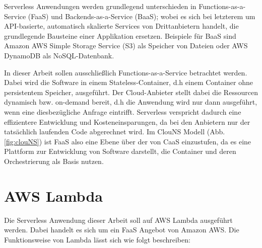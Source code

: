 Serverless Anwendungen werden grundlegend unterschieden in Functions-as-a-Service (FaaS) und Backends-as-a-Service (BaaS); wobei es sich bei letzterem um API-basierte, automatisch skalierte Services von Drittanbietern handelt, die grundlegende Bausteine einer Applikation ersetzen\cite{ken_owens_cncf_2018}. Beispiele für BaaS sind Amazon AWS Simple Storage Service (S3) als Speicher von Dateien oder AWS DynamoDB als NoSQL-Datenbank.

In dieser Arbeit sollen ausschließlich Functions-as-a-Service betrachtet werden. Dabei wird die Software in einem Stateless-Container, d.h einem Container ohne persistentem Speicher, ausgeführt. Der Cloud-Anbieter stellt dabei die Ressourcen dynamisch bzw. on-demand bereit, d.h die Anwendung wird nur dann ausgeführt, wenn eine diesbezügliche Anfrage eintrifft. Serverless verspricht dadurch eine effizientere Entwicklung und Kosteneinsparungen, da bei den Anbietern nur der tatsächlich laufenden Code abgerechnet wird\cite{noauthor_was_2016}. Im ClouNS Modell (Abb. \ref{fig:clouNS}) ist FaaS also eine Ebene über der von CaaS einzustufen, da es eine Plattform zur Entwicklung von Software darstellt, die Container und deren Orchestrierung als Basis nutzen.

\section{AWS Lambda}
Die Serverless Anwendung dieser Arbeit soll auf AWS Lambda ausgeführt werden. Dabei handelt es sich um ein FaaS Angebot von Amazon AWS. Die Funktionsweise von Lambda lässt sich wie folgt beschreiben\cite{amazon_aws_aws_2020}:

